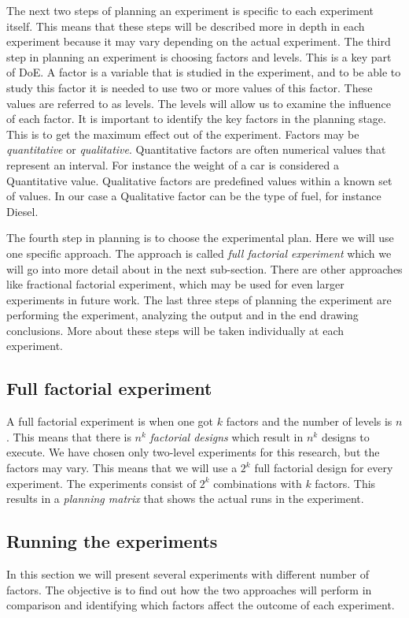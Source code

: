 \documentclass{llncs}
\begin{document}
The next two steps of planning an experiment is specific to each
experiment itself. This means that these steps will be described more
in depth in each experiment because it may vary depending on the
actual experiment.  The third step in planning an experiment is
choosing factors and levels. This is a key part of DoE. A factor is a
variable that is studied in the experiment, and to be able to study
this factor it is needed to use two or more values of this
factor. These values are referred to as levels.  The levels will allow
us to examine the influence of each factor. It is important to
identify the key factors in the planning stage. This is to get the
maximum effect out of the experiment.  Factors may be
\emph{quantitative} or \emph{qualitative}. Quantitative factors
are often numerical values that represent an interval. For instance
the weight of a car is considered a Quantitative value. Qualitative
factors are predefined values within a known set of values.  In our
case a Qualitative factor can be the type of fuel, for instance
Diesel.

The fourth step in planning is to choose the experimental plan. Here
we will use one specific approach. The approach is called \emph{full
  factorial experiment} which we will go into more detail about in the
next sub-section. There are other approaches like fractional factorial
experiment, which may be used for even larger experiments in future work.
The last three steps of planning the experiment are performing the
experiment, analyzing the output and in the end drawing
conclusions. More about these steps will be taken individually at each
experiment. 


\subsection{Full factorial experiment}
A full factorial experiment is when one got $k$ factors and the number
of levels is $n$. This means that there is $n^k$ \emph{factorial designs}
which result in $n^k$ designs to execute.  We have chosen only
two-level experiments for this research, but the factors may
vary. This means that we will use a $2^k$ full factorial design for
every experiment. The experiments consist of $2^k$ combinations with
$k$ factors. This results in a \emph{planning matrix} that shows the
actual runs in the experiment.


\subsection{Running the experiments}
In this section we will present several experiments with different
number of factors.  The objective is to find out how the two approaches
will perform in comparison and identifying which factors affect the
outcome of each experiment.
\end{document}
